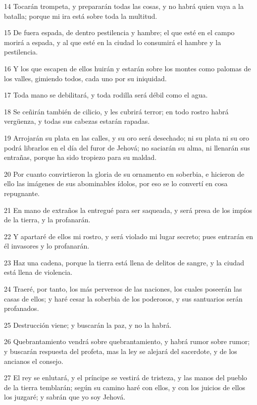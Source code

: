 \par 14 Tocarán trompeta, y prepararán todas las cosas, y no habrá quien vaya a la batalla; porque mi ira está sobre toda la multitud.
\par 15 De fuera espada, de dentro pestilencia y hambre; el que esté en el campo morirá a espada, y al que esté en la ciudad lo consumirá el hambre y la pestilencia.
\par 16 Y los que escapen de ellos huirán y estarán sobre los montes como palomas de los valles, gimiendo todos, cada uno por su iniquidad.
\par 17 Toda mano se debilitará, y toda rodilla será débil como el agua.
\par 18 Se ceñirán también de cilicio, y les cubrirá terror; en todo rostro habrá vergüenza, y todas sus cabezas estarán rapadas.
\par 19 Arrojarán su plata en las calles, y su oro será desechado; ni su plata ni su oro podrá librarlos en el día del furor de Jehová; no saciarán su alma, ni llenarán sus entrañas, porque ha sido tropiezo para su maldad.
\par 20 Por cuanto convirtieron la gloria de su ornamento en soberbia, e hicieron de ello las imágenes de sus abominables ídolos, por eso se lo convertí en cosa repugnante.
\par 21 En mano de extraños la entregué para ser saqueada, y será presa de los impíos de la tierra, y la profanarán.
\par 22 Y apartaré de ellos mi rostro, y será violado mi lugar secreto; pues entrarán en él invasores y lo profanarán.
\par 23 Haz una cadena, porque la tierra está llena de delitos de sangre, y la ciudad está llena de violencia.
\par 24 Traeré, por tanto, los más perversos de las naciones, los cuales poseerán las casas de ellos; y haré cesar la soberbia de los poderosos, y sus santuarios serán profanados.
\par 25 Destrucción viene; y buscarán la paz, y no la habrá.
\par 26 Quebrantamiento vendrá sobre quebrantamiento, y habrá rumor sobre rumor; y buscarán respuesta del profeta, mas la ley se alejará del sacerdote, y de los ancianos el consejo.
\par 27 El rey se enlutará, y el príncipe se vestirá de tristeza, y las manos del pueblo de la tierra temblarán; según su camino haré con ellos, y con los juicios de ellos los juzgaré; y sabrán que yo soy Jehová.

